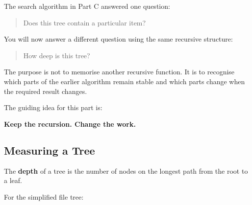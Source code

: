 \documentclass{csc2059practical}
\begin{document}
The search algorithm in Part C answered one question:

\begin{quote}
Does this tree contain a particular item?
\end{quote}

You will now answer a different question using the same recursive structure:

\begin{quote}
How deep is this tree?
\end{quote}

The purpose is not to memorise another recursive function. It is to recognise
which parts of the earlier algorithm remain stable and which parts change when
the required result changes.

\begin{importantnote}
The guiding idea for this part is:

\begin{center}
\textbf{Keep the recursion. Change the work.}
\end{center}
\end{importantnote}

\subsection{Measuring a Tree}

The \textbf{depth} of a tree is the number of nodes on the longest path from the
root to a leaf.

For the simplified file tree:
\end{document}
